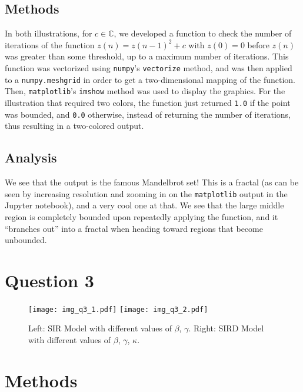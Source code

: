 \documentclass[12pt]{article}
\newcommand{\code}[1]{\colorbox{backcolour}{\texttt{#1}}}
\begin{document}
\subsection*{Methods}

In both illustrations, for \(c \in \mathbb{C}\), we developed a function to check the number of iterations of the function \(z(n) = z(n-1)^2 + c\) with \(z(0) = 0\) before \(z(n)\) was greater than some threshold, up to a maximum number of iterations. This function was vectorized using \code{numpy}'s \code{vectorize} method, and was then applied to a \code{numpy.meshgrid} in order to get a two-dimensional mapping of the function. Then, \code{matplotlib}'s \code{imshow} method was used to display the graphics. For the illustration that required two colors, the function just returned \code{1.0} if the point was bounded, and \code{0.0} otherwise, instead of returning the number of iterations, thus resulting in a two-colored output.

\subsection*{Analysis}

We see that the output is the famous Mandelbrot set! This is a fractal (as can be seen by increasing resolution and zooming in on the \code{matplotlib} output in the Jupyter notebook), and a very cool one at that. We see that the large middle region is completely bounded upon repeatedly applying the function, and it ``branches out'' into a fractal when heading toward regions that become unbounded.

\newpage

\section*{Question 3}

\begin{figure}[H]
    \begin{center}
        \texttt{[image: img\_q3\_1.pdf]}
        \texttt{[image: img\_q3\_2.pdf]}
    \end{center}
    \caption{Left: SIR Model with different values of $\beta$, $\gamma$. Right: SIRD Model with different values of $\beta$, $\gamma$, $\kappa$.}
\end{figure}

\section*{Methods}
\end{document}
